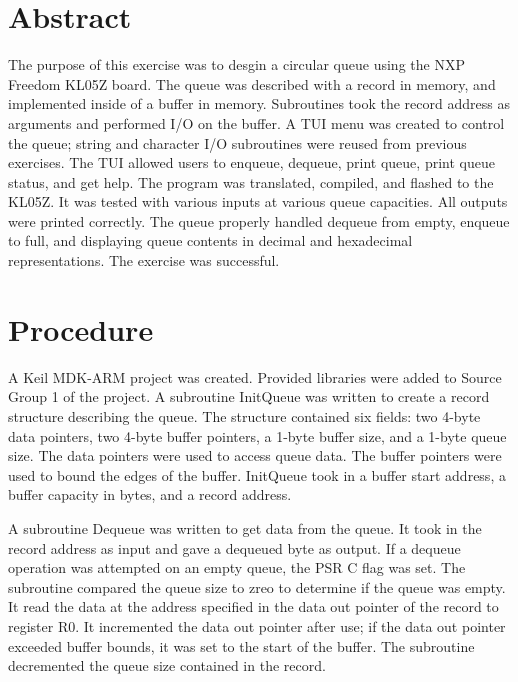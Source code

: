 \documentclass[CMPE]{KGCOEReport}
\begin{document}
\maketitle

\section*{Abstract}

The purpose of this exercise was to desgin a circular queue using the NXP
Freedom KL05Z board. The queue was described with a record in memory, and
implemented inside of a buffer in memory. Subroutines took the record address
as arguments and performed I/O on the buffer. A TUI menu was created to control
the queue; string and character I/O subroutines were reused from previous
exercises. The TUI allowed users to enqueue, dequeue, print queue, print queue
status, and get help. The program was translated, compiled, and flashed to the
KL05Z. It was tested with various inputs at various queue capacities. All
outputs were printed correctly. The queue properly handled dequeue from empty,
enqueue to full, and displaying queue contents in decimal and hexadecimal
representations. The exercise was successful.

\section*{Procedure}

A Keil MDK-ARM project was created. Provided libraries were added to Source
Group 1 of the project. A subroutine InitQueue was written to create a record
structure describing the queue. The structure contained six fields: two 4-byte
data pointers, two 4-byte buffer pointers, a 1-byte buffer size, and a 1-byte
queue size. The data pointers were used to access queue data. The buffer
pointers were used to bound the edges of the buffer. InitQueue took in a buffer
start address, a buffer capacity in bytes, and a record address.

A subroutine Dequeue was written to get data from the queue. It took in the
record address as input and gave a dequeued byte as output. If a dequeue
operation was attempted on an empty queue, the PSR C flag was set. The
subroutine compared the queue size to zreo to determine if the queue was empty.
It read the data at the address specified in the data out pointer of the record
to register R0. It incremented the data out pointer after use; if the data out
pointer exceeded buffer bounds, it was set to the start of the buffer. The
subroutine decremented the queue size contained in the record.
\end{document}
